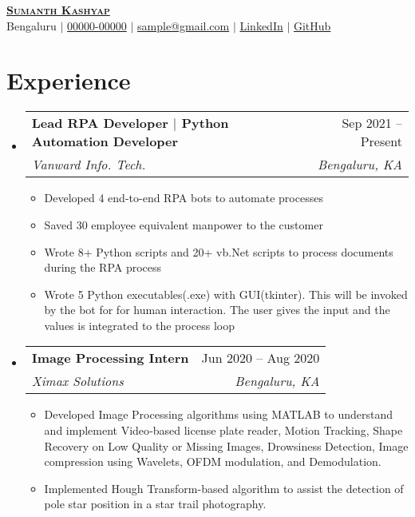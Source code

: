 \documentclass[letterpaper,11pt]{article}
\makeatletter
\newcommand{\resumeItem}[1]{
  \item\small{
    {#1 \vspace{-2pt}}
  }
}
\newcommand{\resumeSubheading}[4]{
  \vspace{-2pt}\item
    \begin{tabular*}{0.97\textwidth}[t]{l@{\extracolsep{\fill}}r}
      \textbf{#1} & #2 \\
      \textit{\small#3} & \textit{\small #4} \\
    \end{tabular*}\vspace{-7pt}
}
\newcommand{\resumeSubHeadingListStart}{\begin{itemize}[leftmargin=0.15in, label={}]}
\newcommand{\resumeSubHeadingListEnd}{\end{itemize}}
\newcommand{\resumeItemListStart}{\begin{itemize}}
\newcommand{\resumeItemListEnd}{\end{itemize}\vspace{-5pt}}
\makeatother
\begin{document}
\begin{center}
    \textbf{\Huge \scshape 
    \href{https://github.com/bheemaguli/resume}{Sumanth Kashyap{\tiny\color{blue}\faLink}}} \\ 
    \vspace{1pt}
    \faMapMarker \hspace{0.2mm} Bengaluru $|$ 
    \faPhone     \hspace{0.2mm} \href{tel:+91-00000-00000}{00000-00000} $|$ 
    \faEnvelope  \hspace{0.2mm} \href{mailto:sample@gmail.com}{sample@gmail.com} $|$ 
    \faLinkedinSquare \hspace{0.2mm} \href{https://www.linkedin.com/in/asdf1234/}{LinkedIn} $|$
    \faGithub    \hspace{0.2mm} \href{https://github.com/bheemaguli/}{GitHub}
\end{center}

\section{Experience}
  \resumeSubHeadingListStart

    \resumeSubheading
      {Lead RPA Developer $|$ {\transparent{0.75}Python Automation Developer}}{Sep 2021 -- Present}
      {Vanward Info. Tech.}{Bengaluru, KA}
      \resumeItemListStart
        \resumeItem{Developed 4 end-to-end RPA bots to automate processes}
        \resumeItem{Saved 30 employee equivalent manpower to the customer}
        \resumeItem{Wrote 8+ Python scripts and 20+ vb.Net scripts to process documents during the RPA process}
        \resumeItem{Wrote 5 Python executables(.exe) with GUI(tkinter). This will be invoked by the bot for for human interaction. The user gives the input and the values is integrated to the process loop}
    \resumeItemListEnd
    \resumeSubheading
      {Image Processing Intern}{Jun 2020 -- Aug 2020}
      {Ximax Solutions}{Bengaluru, KA}
      \resumeItemListStart
        \resumeItem{Developed Image Processing algorithms using MATLAB to understand and implement Video‐based license plate reader, Motion Tracking, Shape Recovery on Low Quality or Missing Images, Drowsiness Detection, Image compression using Wavelets, OFDM modulation, and Demodulation.}
        \resumeItem{Implemented Hough Transform-based algorithm to assist the detection of pole star position in a star trail photography.}
    \resumeItemListEnd
  \resumeSubHeadingListEnd
\end{document}
